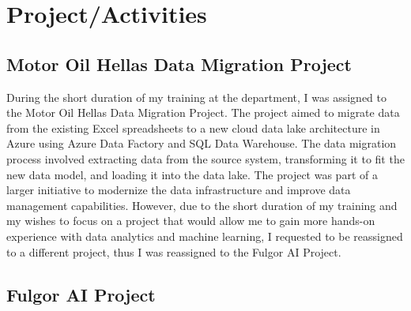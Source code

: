 \chapter{Project/Activities}
\label{ch:project}

\section{Motor Oil Hellas Data Migration Project}

During the short duration of my training at the department, I was assigned to
the Motor Oil Hellas Data Migration Project. The project aimed to migrate data
from the existing Excel spreadsheets to a new cloud data lake architecture in
Azure using Azure Data Factory and SQL Data Warehouse. The data migration
process involved extracting data from the source system, transforming it to fit
the new data model, and loading it into the data lake. The project was part of
a larger initiative to modernize the data infrastructure and improve data
management capabilities. However, due to the short duration of my training and
my wishes to focus on a project that would allow me to gain more hands-on
experience with data analytics and machine learning, I requested to be
reassigned to a different project, thus I was reassigned to the Fulgor AI
Project.

\section{Fulgor AI Project}

